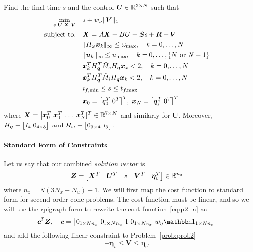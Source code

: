 \documentclass[12pt]{article}
\begin{document}
\begin{problem}\label{prob:prob2}
Find the final time $s$ and the control $\bm{U}\in{\mathbb{R}}^{3 \times N}$ such that
\begin{subequations}\label{eq:prob2}
\begin{align}
\min_{s,\bm{U},\bm{X},\bm{V}} &\quad s + w_{\nu} \| \bm{V} \|_1 \label{eq:p2_a}\\
\text{subject to:} &\quad \bm{X} = A \bm{X} + B \bm{U} + \bm{S} s + \bm{R} + \bm{V} \label{eq:p2_b}\\
&\quad \| H_{\omega} \bm{x}_k \|_{\infty} \leq \omega_{\max}, \quad k=0,\ldots,N \label{eq:p2_c}\\ 
&\quad \| \bm{u}_k \|_{\infty} \leq u_{\max}, \quad k=0,\ldots,\{N \text{ or } N-1\} \label{eq:p2_d}\\
&\quad \bm{x}_k^T H_{\bm{q}}^T \tilde{M}_e H_{\bm{q}} \bm{x}_k < 2, \quad k=0,\ldots,N \label{eq:p2_e}\\
&\quad \bm{x}_k^T H_{\bm{q}}^T \tilde{M}_i H_{\bm{q}} \bm{x}_k < 2, \quad k=0,\ldots,N \label{eq:p2_f}\\
&\quad t_{f,\min} \leq s \leq t_{f,\max} \label{eq:p2_g}\\
&\quad \bm{x}_0 = \big[ \bm{q}_0^T \; 0^T \big]^T, \; \bm{x}_N = \big[ \bm{q}_f^T \; 0^T \big]^T \label{eq:p2_h}
\end{align}
\end{subequations}
where $\bm{X} = \big[ \bm{x}_0^T \; \bm{x}_1^T \; \ldots \; \bm{x}_{N}^T ]^T \in {\mathbb{R}}^{7 \times N}$ and similarly for $\bm{U}$. Moreover, $H_{\bm{q}} = \big[ I_{4} \; 0_{4 \times 3} \big]$ and $H_{\omega} = \big[ 0_{3 \times 4} \; I_{3} \big]$.
\end{problem}

\paragraph{Standard Form of Constraints}

Let us say that our combined \textit{solution vector} is 
\begin{equation*}
\bm{Z} = \begin{bmatrix}
\bm{X}^T & \bm{U}^T & s & \bm{V}^T & \bm{\eta}_v^T
\end{bmatrix} \in {\mathbb{R}}^{n_z}
\end{equation*}
where $n_z = N(3N_x + N_u)+1$. We will first map the cost function to standard form for second-order cone problems. The cost function must be linear, and so we will use the epigraph form to rewrite the cost function~\eqref{eq:p2_a} as
\begin{equation}
\bm{c}^T \bm{Z}, \quad \bm{c} = \big[ \zeros{1}{N n_x} \ \zeros{1}{N n_u} \ 1 \ \zeros{1}{N n_x} \ w_{\eta} \ones{1}{N n_x} \big]
\label{eq:std_cost}
\end{equation}
and add the following linear constraint to Problem~\ref{prob:prob2}
\begin{equation}
- \bm{\eta}_v \leq \bm{V} \leq \bm{\eta}_v.
\label{eq:p2_epi}
\end{equation}
\end{document}
